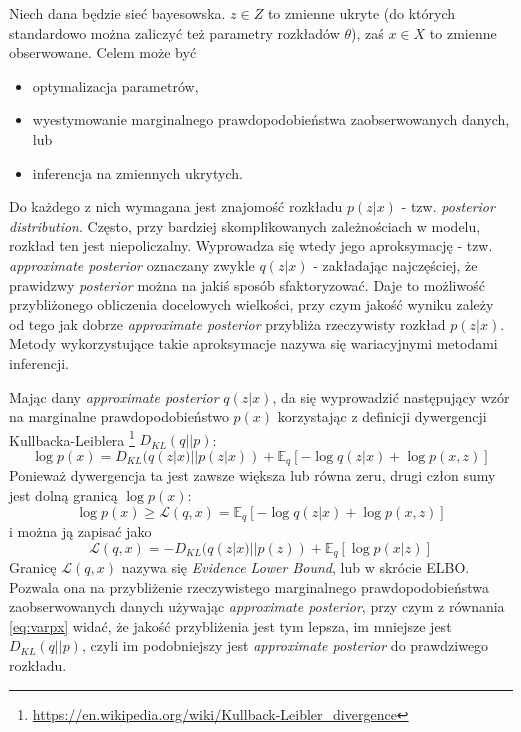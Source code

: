 \documentclass[magisterska]{pracamgr}
\begin{document}
Niech dana będzie sieć bayesowska. $z \in Z$ to zmienne ukryte (do których standardowo można zaliczyć też parametry rozkładów $\theta$), zaś $x \in X$ to zmienne obserwowane. Celem może być
\begin{itemize}
    \setlength\itemsep{0em}
    \item optymalizacja parametrów,
    \item wyestymowanie marginalnego prawdopodobieństwa zaobserwowanych danych, lub
    \item inferencja na zmiennych ukrytych.
\end{itemize}
Do każdego z nich wymagana jest znajomość rozkładu $p(z|x)$ - tzw. \textit{posterior distribution}. Często, przy bardziej skomplikowanych zależnościach w modelu, rozkład ten jest niepoliczalny. Wyprowadza się wtedy jego aproksymację - tzw. \textit{approximate posterior} oznaczany zwykle $q(z|x)$ - zakładając najczęściej, że prawidzwy \textit{posterior} można na jakiś sposób sfaktoryzować. Daje to możliwość przybliżonego obliczenia docelowych wielkości, przy czym jakość wyniku zależy od tego jak dobrze \textit{approximate posterior} przybliża rzeczywisty rozkład $p(z|x)$. Metody wykorzystujące takie aproksymacje nazywa się wariacyjnymi metodami inferencji.

Mając dany \textit{approximate posterior} $q(z|x)$, da się wyprowadzić następujący wzór na marginalne prawdopodobieństwo $p(x)$ korzystając z definicji dywergencji Kullbacka-Leiblera \footnote{\url{https://en.wikipedia.org/wiki/Kullback-Leibler_divergence}} $D_{KL}(q || p)$:
\begin{equation} \label{eq:varpx}
    \log p(x) = D_{KL}(q(z|x) || p(z|x)) + \mathbb{E}_{q}[-\log q(z|x) + \log p(x, z)]
\end{equation}
Ponieważ dywergencja ta jest zawsze większa lub równa zeru, drugi człon sumy jest dolną granicą $\log p(x)$:
\begin{equation} \label{eq:boundVerA}
    \log p(x) \geq \mathcal{L}(q, x) = \mathbb{E}_{q}[-\log q(z|x) + \log p(x, z)]
\end{equation}
i można ją zapisać jako
\begin{equation} \label{eq:boundVerB}
    \mathcal{L}(q, x) = -D_{KL}(q(z|x) || p(z)) + \mathbb{E}_{q}[\log p(x|z)]
\end{equation}
Granicę $\mathcal{L}(q, x)$ nazywa się \textit{Evidence Lower Bound}, lub w skrócie ELBO. Pozwala ona na przybliżenie rzeczywistego marginalnego prawdopodobieństwa zaobserwowanych danych używając \textit{approximate posterior}, przy czym z równania \ref{eq:varpx} widać, że jakość przybliżenia jest tym lepsza, im mniejsze jest $D_{KL}(q || p)$, czyli im podobniejszy jest \textit{approximate posterior} do prawdziwego rozkładu. \\
\end{document}
